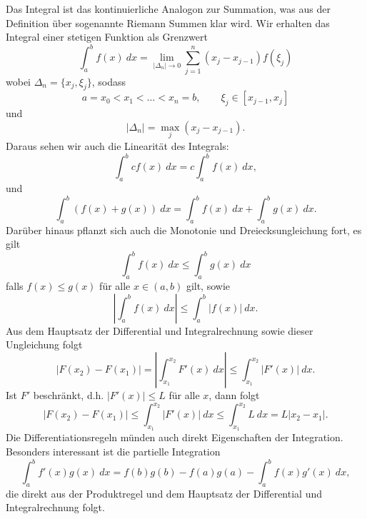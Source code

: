 Das Integral ist das kontinuierliche Analogon zur Summation, was aus der Definition über sogenannte Riemann Summen klar wird. Wir erhalten das Integral einer stetigen Funktion als Grenzwert
\begin{equation*}
 \int_a^b f(x)~dx = \lim_{|\Delta_n| \rightarrow 0} \sum_{j=1}^n (x_j - x_{j-1}) f(\xi_j)\end{equation*}
wobei \(\Delta_n = \{x_j,\xi_j\}\), sodass
\begin{equation*}
 a = x_0 < x_1 < \ldots < x_n =b, \qquad \xi_j \in [x_{j-1},x_j]
\end{equation*}
und
\begin{equation*}
 \vert \Delta_n \vert = \max_j (x_j - x_{j-1}).\end{equation*}
Daraus sehen wir auch die Linearität des Integrals:
\begin{equation*}
 \int_a^b  c f(x) ~dx = c \int_a^b   f(x) ~dx,\end{equation*}
und
\begin{equation*}
 \int_a^b   ( f(x) + g(x)) ~dx = \int_a^b   f(x) ~dx + \int_a^b   g(x) ~dx.\end{equation*}
Darüber hinaus pflanzt sich auch die Monotonie und Dreiecksungleichung fort, es gilt
\begin{equation*}
 \int_a^b   f(x) ~dx \leq  \int_a^b   g(x) ~dx \end{equation*}
falls \(f(x) \leq g(x)\) für alle \(x \in (a,b)\) gilt, sowie
\begin{equation*}
 \left\vert \int_a^b   f(x) ~dx \right\vert \leq  \int_a^b  \vert  f(x) \vert ~dx .\end{equation*}
Aus dem Hauptsatz der Differential  und Integralrechnung sowie dieser Ungleichung folgt
\begin{equation*}
\vert F(x_2) - F(x_1) \vert = \left\vert \int_{x_1}^{x_2}   F'(x) ~dx \right\vert
\leq  \int_{x_1}^{x_2}  \vert F'(x) \vert ~dx.
\end{equation*}
Ist \(F'\) beschränkt, d.h. \(\vert F'(x) \vert \leq L\) für alle \(x\), dann folgt
\begin{equation*}
 \vert F(x_2) - F(x_1) \vert \leq  \int_{x_1}^{x_2}  \vert F'(x) \vert ~dx
\leq  \int_{x_1}^{x_2}  L ~dx = L \vert x_2 - x_1 \vert.
\end{equation*}
Die Differentiationsregeln münden auch direkt Eigenschaften der Integration. Besonders interessant ist die partielle Integration
\begin{equation*}
  \int_a^b f'(x) g(x)~dx = f(b) g(b) - f(a) g(a) - \int_a^b f(x) g'(x)~dx,\end{equation*}
die direkt aus der Produktregel und dem Hauptsatz der Differential  und Integralrechnung folgt.


